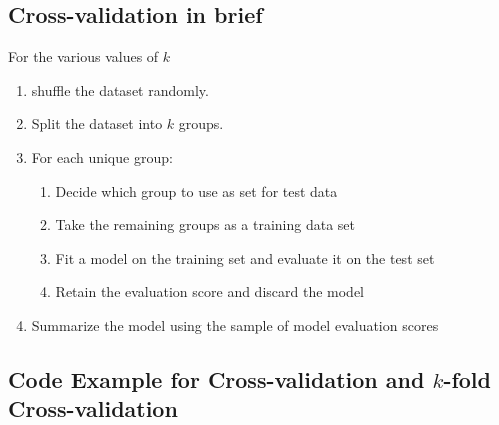 \documentclass[%
oneside,                 %
final,                   %
10pt]{article}
\begin{document}
\subsection*{Cross-validation in brief}

For the various values of $k$

\begin{enumerate}
\item shuffle the dataset randomly.

\item Split the dataset into $k$ groups.

\item For each unique group:
\begin{enumerate}

\item Decide which group to use as set for test data

\item Take the remaining groups as a training data set

\item Fit a model on the training set and evaluate it on the test set

\item Retain the evaluation score and discard the model

\end{enumerate}

\noindent
\item Summarize the model using the sample of model evaluation scores
\end{enumerate}

\noindent
\subsection*{Code Example for Cross-validation and $k$-fold Cross-validation}
\end{document}
